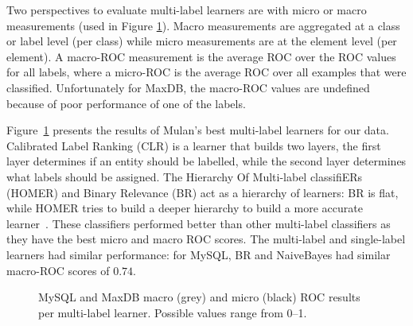 \documentclass[]{sig-alternate}
\begin{document}
Two perspectives to evaluate multi-label learners are with micro or macro measurements (used in Figure \ref{fig:mulan}).
Macro measurements are aggregated at a class or label level (per class) while micro measurements are at the element level (per element).
A macro-ROC measurement is the average ROC over the ROC values for all labels, where a micro-ROC is the average ROC over all examples that were classified. 
Unfortunately for MaxDB, the macro-ROC values are undefined because of poor performance of one of the labels.%

Figure~\ref{fig:mulan} presents the results of Mulan's best multi-label learners for our data. 
Calibrated Label Ranking (CLR) is a learner that builds two layers, the first layer determines if an entity should be labelled, while the second layer determines what labels should be assigned.
The Hierarchy Of Multi-label classifiERs (HOMER) and Binary Relevance (BR) act as a hierarchy of learners: BR is flat, while HOMER tries to build a deeper hierarchy to build a more accurate learner~\cite{mulan}. 
These classifiers performed better than other multi-label classifiers as they have the best micro and macro ROC scores. 
The multi-label and single-label learners had similar performance: for MySQL, BR and NaiveBayes had similar macro-ROC scores of $0.74$.

\begin{figure}
\centering
{}
\caption[]{MySQL and MaxDB macro (grey) and micro (black) ROC results per multi-label learner. Possible values range from 0--1.
}
\label{fig:mulan}
\end{figure}
\end{document}
